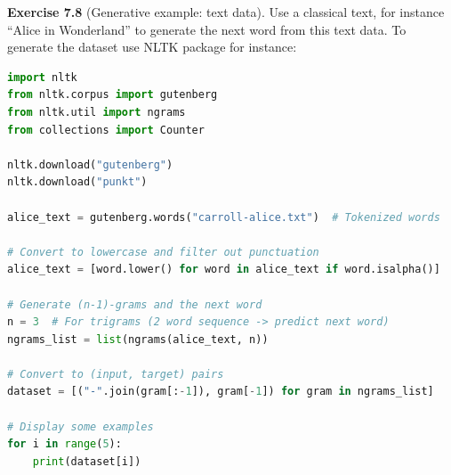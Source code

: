 \begin{tcolorbox}[remarkbox]
\textbf{Exercise 7.8} (Generative example: text data). Use a classical text, for instance ``Alice in Wonderland'' to generate the next word from this text data. To generate the dataset use NLTK package for instance:
\begin{lstlisting}[language=Python]
import nltk
from nltk.corpus import gutenberg
from nltk.util import ngrams
from collections import Counter

nltk.download("gutenberg")
nltk.download("punkt")

alice_text = gutenberg.words("carroll-alice.txt")  # Tokenized words

# Convert to lowercase and filter out punctuation
alice_text = [word.lower() for word in alice_text if word.isalpha()]

# Generate (n-1)-grams and the next word
n = 3  # For trigrams (2 word sequence -> predict next word)
ngrams_list = list(ngrams(alice_text, n))

# Convert to (input, target) pairs
dataset = [("-".join(gram[:-1]), gram[-1]) for gram in ngrams_list]

# Display some examples
for i in range(5):
    print(dataset[i])
\end{lstlisting}
\end{tcolorbox}
